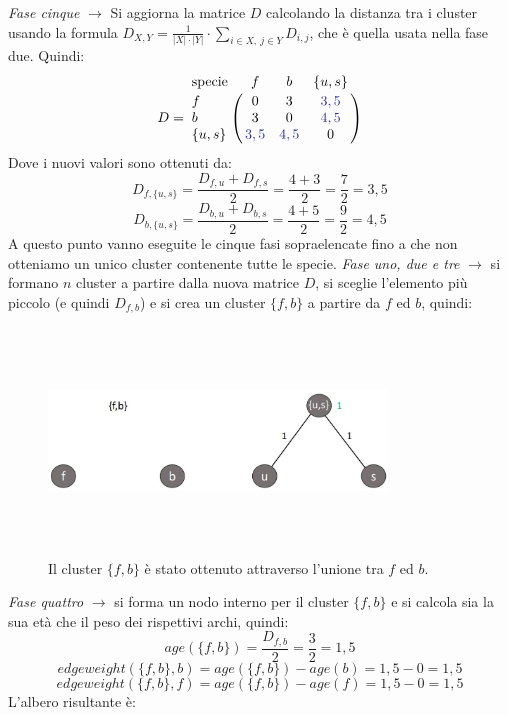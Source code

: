 \newline
\textit{Fase cinque} $\rightarrow$ Si aggiorna la matrice $D$ calcolando la distanza tra i cluster usando la formula $D_{X,Y}=\frac{1}{\left | X \right |\cdot \left | Y \right |} \cdot \sum_{i\in X,\: j\in Y}D_{i,j}$, che è quella usata nella fase due. Quindi:
\[
D = \bordermatrix{\text{specie}&f&b&\{u, s\}\cr
                f& 0 & 3 & {\color{Blue} 3,5}\cr
                b& 3 & 0 & {\color{Blue} 4,5}\cr
                \{u, s\}& {\color{Blue} 3,5} & {\color{Blue} 4,5} & 0}
\]
Dove i nuovi valori sono ottenuti da:
\[D_{f, \{u, s\}}=\frac{D_{f,u}+D_{f,s}}{2}=\frac{4+3}{2}=\frac{7}{2}=3,5\]
\[D_{b, \{u, s\}}=\frac{D_{b,u}+D_{b,s}}{2}=\frac{4+5}{2}=\frac{9}{2}=4,5\]
A questo punto vanno eseguite le cinque fasi sopraelencate fino a che non otteniamo un unico cluster contenente tutte le specie.
\newline
\textit{Fase uno, due e tre} $\rightarrow$  si formano $n$ cluster a partire dalla nuova matrice $D$, si sceglie l'elemento più piccolo (e quindi $D_{f, b}$) e si crea un cluster $\{f, b\}$ a partire da $f$ ed $b$, quindi:
\begin{figure}[h!]
\centering
	\includegraphics[height=6cm, width=9cm,keepaspectratio]{rooted_upgma_5.jpg}
 	\caption{Il cluster $\{f, b\}$ è stato ottenuto attraverso l'unione tra $f$ ed $b$.}
  	\label{fig:rooted_upgma_5}
\end{figure}
\newline 
\textit{Fase quattro} $\rightarrow$ si forma un nodo interno per il cluster $\{f, b\}$ e si calcola sia la sua età che il peso dei rispettivi archi, quindi:
\[age(\{f, b\})=\frac{D_{f,b}}{2}=\frac{3}{2}=1,5\]
\[edgeweight(\{f, b\},b)=age(\{f, b\})-age(b)=1,5-0=1,5\]
\[edgeweight(\{f, b\},f)=age(\{f, b\})-age(f)=1,5-0=1,5\]
L'albero risultante è:
